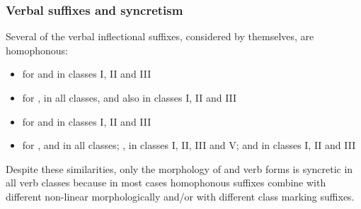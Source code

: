 \FB

\subsubsection{Verbal suffixes and syncretism}\label{verbalSuffixesSyncretism}
Several of the verbal inflectional suffixes, considered by themselves, are homophonous: %
\begin{itemize}
\item{ for  and  in classes I, II and III}
\item{ for ,  in all classes, and also  in classes I, II and III}
\item{ for  and  in classes I, II and III}
\item{ for ,  and  in all classes; ,  in classes I, II, III and V; and  in classes I, II and III}
\end{itemize}

Despite these similarities, only the morphology of  and  verb forms is syncretic in all verb classes because in most cases homophonous suffixes combine with different non-linear morphologically and/or with different class marking suffixes. 

\clearpage

